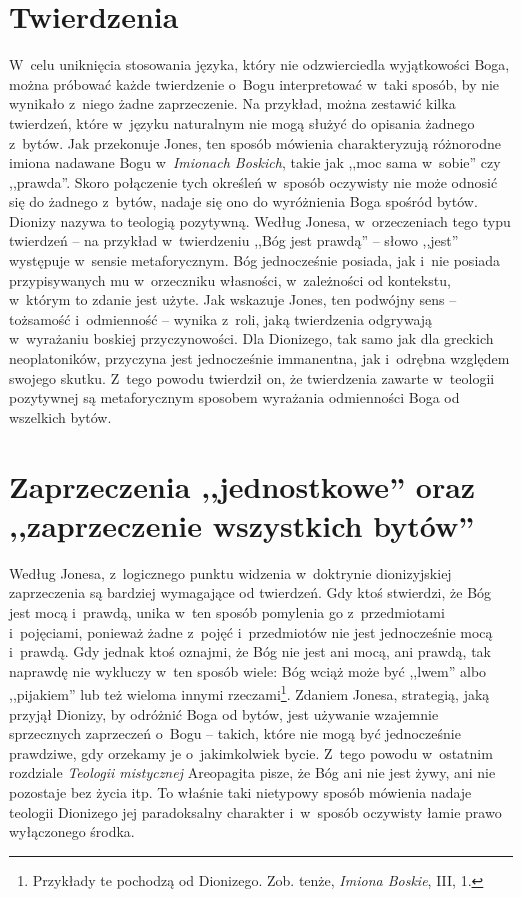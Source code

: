 \section{Twierdzenia}

W~celu uniknięcia stosowania języka, który nie odzwierciedla wyjątkowości Boga, można próbować każde twierdzenie o~Bogu interpretować w~taki sposób, by nie wynikało z~niego żadne zaprzeczenie. Na przykład, można zestawić kilka twierdzeń, które w~języku naturalnym nie mogą służyć do opisania żadnego z~bytów. Jak przekonuje Jones, ten sposób mówienia charakteryzują różnorodne imiona nadawane Bogu w~\textit{Imionach Boskich}, takie jak ,,moc sama w~sobie'' czy ,,prawda''. Skoro połączenie tych określeń w~sposób oczywisty nie może odnosić się do żadnego z~bytów, nadaje się ono do wyróżnienia Boga spośród bytów. Dionizy nazywa to teologią pozytywną. Według Jonesa, w~orzeczeniach tego typu twierdzeń -- na przykład w~twierdzeniu ,,Bóg jest prawdą'' -- słowo ,,jest'' występuje w~sensie metaforycznym. Bóg jednocześnie posiada, jak i~nie posiada przypisywanych mu w~orzeczniku własności, w~zależności od kontekstu, w~którym to zdanie jest użyte. Jak wskazuje Jones, ten podwójny sens -- tożsamość i~odmienność -- wynika z~roli, jaką twierdzenia odgrywają w~wyrażaniu boskiej przyczynowości. Dla Dionizego, tak samo jak dla greckich neoplatoników, przyczyna jest jednocześnie immanentna, jak i~odrębna względem swojego skutku. Z~tego powodu twierdził on, że twierdzenia zawarte w~teologii pozytywnej są metaforycznym sposobem wyrażania odmienności Boga od wszelkich bytów.


\section{Zaprzeczenia ,,jednostkowe'' oraz ,,zaprzeczenie wszystkich bytów''}

Według Jonesa, z~logicznego punktu widzenia w~doktrynie dionizyjskiej zaprzeczenia są bardziej wymagające od twierdzeń. Gdy ktoś stwierdzi, że Bóg jest mocą i~prawdą, unika w~ten sposób pomylenia go z~przedmiotami i~pojęciami, ponieważ żadne z~pojęć i~przedmiotów nie jest jednocześnie mocą i~prawdą. Gdy jednak ktoś oznajmi, że Bóg nie jest ani mocą, ani prawdą, tak naprawdę nie wykluczy w~ten sposób wiele: Bóg wciąż może być ,,lwem'' albo ,,pijakiem'' lub też wieloma innymi rzeczami\footnote{Przykłady te pochodzą od Dionizego. Zob. tenże, \textit{Imiona Boskie}, III, 1.}. Zdaniem Jonesa, strategią, jaką przyjął Dionizy, by odróżnić Boga od bytów, jest używanie wzajemnie sprzecznych zaprzeczeń o~Bogu -- takich, które nie mogą być jednocześnie prawdziwe, gdy orzekamy je o~jakimkolwiek bycie. Z~tego powodu w~ostatnim rozdziale \textit{Teologii mistycznej} Areopagita pisze, że Bóg ani nie jest żywy, ani nie pozostaje bez życia itp. To właśnie taki nietypowy sposób mówienia nadaje teologii Dionizego jej paradoksalny charakter i~w~sposób oczywisty łamie prawo wyłączonego środka.

